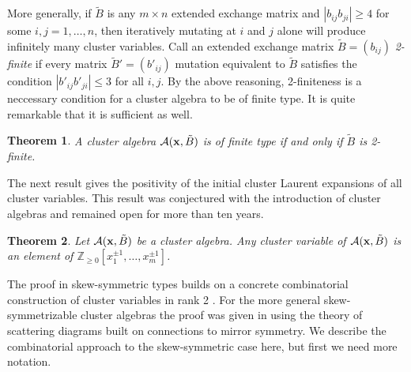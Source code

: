 \documentclass{amsart}
\newtheorem{theorem}{Theorem}[section]
\theoremstyle{definition}
\theoremstyle{remark}
\numberwithin{equation}{section}
\newcommand{\cA}{{\mathcal{A}}}
\newcommand{\x}{{\bf x}}
\newcommand{\bx}{{\bf x}}
\newcommand{\ZZ}{{\mathbb{Z}}}
\begin{document}
    
  More generally, if $\tilde{B}$ is any $m\times n$ extended exchange matrix and $|b_{ij}b_{ji}| \geq 4$ for some $i,j=1,\ldots, n$, then iteratively mutating at $i$ and $j$ alone will produce infinitely many cluster variables.  Call an extended exchange matrix $\tilde B=(b_{ij})$ \emph{2-finite} if every matrix $\tilde B'=(b'_{ij})$ mutation equivalent to $\tilde B$ satisfies the condition $|b'_{ij}b'_{ji}|\le3$ for all $i,j$.  By the above reasoning, 2-finiteness is a neccessary condition for a cluster algebra to be of finite type.  It is quite remarkable that it is sufficient as well.
  \begin{theorem}\cite{FZ03}
    A cluster algebra $\cA(\x,\tilde B)$ is of finite type if and only if $\tilde B$ is 2-finite.
  \end{theorem}

  The next result gives the positivity of the initial cluster Laurent expansions of all cluster variables.  This result was conjectured with the introduction of cluster algebras \cite{FZ02} and remained open for more than ten years.  
  \begin{theorem}\cite{LS15,GHKK14}
    Let $\cA(\bx,\tilde B)$ be a cluster algebra.  Any cluster variable of $\cA(\bx,\tilde B)$ is an element of $\ZZ_{\ge0}[x_1^{\pm1},\ldots,x_m^{\pm1}]$.
  \end{theorem}
  The proof in skew-symmetric types builds on a concrete combinatorial construction of cluster variables in rank 2 \cite{LS13,LLZ14}.  For the more general skew-symmetrizable cluster algebras the proof was given in \cite{GHKK14} using the theory of scattering diagrams built on connections to mirror symmetry.  We describe the combinatorial approach to the skew-symmetric case here, but first we need more notation.
\end{document}
